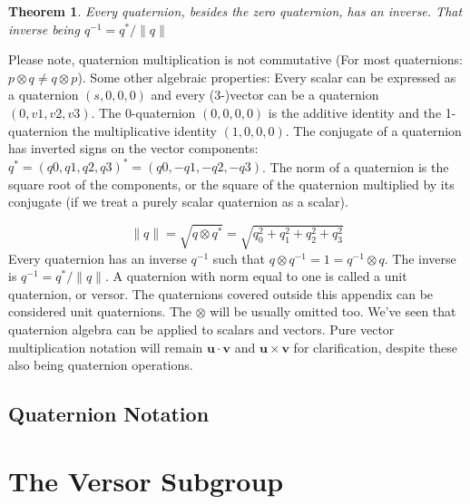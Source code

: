\documentclass{amsart}
\newtheorem{theorem}{Theorem}[section]
\theoremstyle{definition}
\theoremstyle{remark}
\numberwithin{equation}{section}
\begin{document}
\begin{theorem}
  Every quaternion, besides the zero quaternion, has an inverse. That inverse being $q^{-1} = q^*/\|q\|$
\end{theorem}

Please note, quaternion multiplication is not commutative (For most quaternions: $p\otimes q\neq q \otimes p$). Some other algebraic properties:
Every scalar can be expressed as a quaternion $(s, 0, 0, 0)$ and every (3-)vector can be a quaternion $(0, v1, v2, v3)$. The 0-quaternion $(0, 0, 0, 0)$ is the additive identity and the 1-quaternion the multiplicative identity $(1, 0, 0, 0)$. The conjugate of a quaternion has inverted signs on the vector components: $q^*=(q0, q1, q2, q3)^*=(q0, -q1, -q2, -q3)$. The norm of a quaternion is the square root of the components, or the square of the quaternion multiplied by its conjugate (if we treat a purely scalar quaternion as a scalar).

\begin{equation}
  \|q\| = \sqrt{q\otimes q^*} = \sqrt{q_0^2+q_1^2+q_2^2+q_3^2}
\end{equation}
Every quaternion has an inverse $q^{-1}$ such that $q\otimes q^{-1}=1=q^{-1}\otimes q$. The inverse is $q^{-1}=q^*/\|q\|$. A quaternion with norm equal to one is called a unit quaternion, or versor. The quaternions covered outside this appendix can be considered unit quaternions. The $\otimes$ will be usually omitted too. We've seen that quaternion algebra can be applied to scalars and vectors. Pure vector multiplication notation will remain $\mathbf{u}\cdot\mathbf{v}$ and $\mathbf{u}\times\mathbf{v}$ for clarification, despite these also being quaternion operations.

\subsection{Quaternion Notation}


\section{The Versor Subgroup}
  
\end{document}
